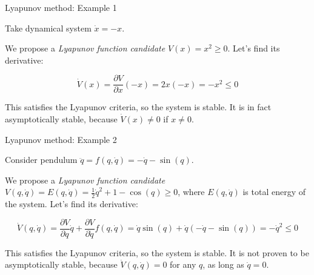 \documentclass{beamer}
\begin{document}
\begin{frame}{Lyapunov method: Example 1}
\begin{flushleft}

Take dynamical system $\dot{x} = -x$. 

\bigskip

We propose a \emph{Lyapunov function candidate} $V(x) = x^2 \geq 0$. Let's find its derivative:

\begin{equation}
    \dot V(x) = \frac{\partial V}{\partial x} (-x) = 2x (-x) = -x^2 \leq 0
\end{equation}

This satisfies the Lyapunov criteria, so the system is stable. It is in fact asymptotically stable, because $\dot V(x) \neq 0$ if $x \neq 0$.

\end{flushleft}
\end{frame}



\begin{frame}{Lyapunov method: Example 2}
	\begin{flushleft}
		
		Consider pendulum $\ddot{q} = f(q, \dot{q}) = -\dot{q} - \sin(q)$. 
		
		\bigskip
		
		We propose a \emph{Lyapunov function candidate} $V(q, \dot{q}) = E(q, \dot{q}) = \frac{1}{2} \dot{q}^2 + 1 - \cos(q)\geq 0$, where $E(q, \dot{q})$ is total energy of the system. Let's find its derivative:
		
		\begin{equation}
			\dot V(q, \dot{q}) = 
			\frac{\partial V}{\partial q}       \dot{q} +
			\frac{\partial V}{\partial \dot{q}} f(q, \dot{q}) = 
			\dot{q} \sin(q) + \dot{q}(-\dot{q} - \sin(q)) =
			-\dot{q}^2 \leq 0
		\end{equation}
		
		
		This satisfies the Lyapunov criteria, so the system is stable. It is not proven to be asymptotically stable, because $\dot V(q, \dot{q}) = 0$ for any $q$, as long as $\dot{q} = 0$.
		
	\end{flushleft}
\end{frame}
\end{document}
